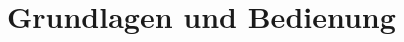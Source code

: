 \graphicspath{{./images/}}      
\def\CHAPTERONE{./chapters/Chapter-1} 

\chapter{Grundlagen und Bedienung}
\label{chap:basics}
%	
